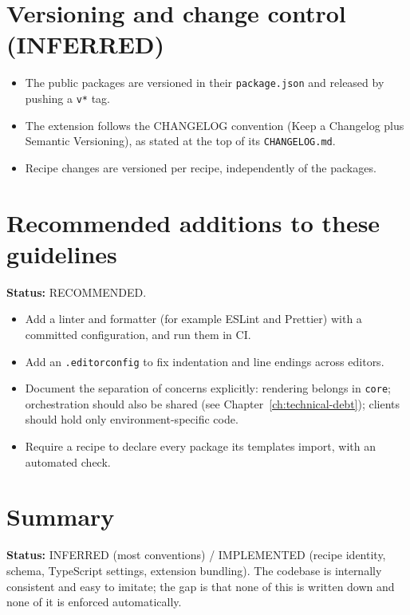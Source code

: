 \section{Versioning and change control (INFERRED)}

\begin{itemize}
  \item The public packages are versioned in their \texttt{package.json} and
        released by pushing a \texttt{v*} tag.
  \item The extension follows the CHANGELOG convention (Keep a Changelog plus
        Semantic Versioning), as stated at the top of its \texttt{CHANGELOG.md}.
  \item Recipe changes are versioned per recipe, independently of the packages.
\end{itemize}

\section{Recommended additions to these guidelines}

\textbf{Status:} RECOMMENDED.

\begin{itemize}
  \item Add a linter and formatter (for example ESLint and Prettier) with a
        committed configuration, and run them in CI.
  \item Add an \texttt{.editorconfig} to fix indentation and line endings across
        editors.
  \item Document the separation of concerns explicitly: rendering belongs in
        \texttt{core}; orchestration should also be shared (see
        Chapter~\ref{ch:technical-debt}); clients should hold only
        environment-specific code.
  \item Require a recipe to declare every package its templates import, with an
        automated check.
\end{itemize}

\section{Summary}

\textbf{Status:} INFERRED (most conventions) / IMPLEMENTED (recipe identity,
schema, TypeScript settings, extension bundling). The codebase is internally
consistent and easy to imitate; the gap is that none of this is written down and
none of it is enforced automatically.
